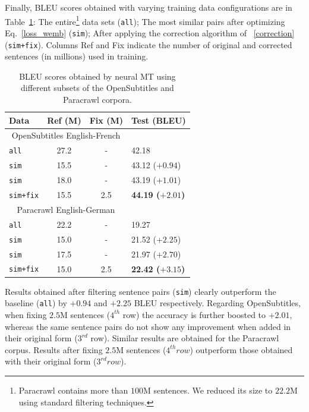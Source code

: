 \documentclass[11pt,a4paper]{article}
\begin{document}
Finally, BLEU scores obtained with varying training data configurations are in Table~\ref{results}:
The entire\footnote{Paracrawl contains more than $100$M sentences. We reduced its size to $22.2$M using standard filtering techniques.} data sets (\texttt{all}); 
The most similar pairs after optimizing Eq.~\eqref{loss_wemb} (\texttt{sim}); 
After applying the correction algorithm of \textsection~\ref{correction} (\texttt{sim+fix}).
Columns Ref and Fix indicate the number of original and corrected sentences (in millions) used in training.

\begin{table}[h!]
\small
\center
\begin{tabular}{lccl}
\hline
\bf Data & \bf Ref (M) & \bf Fix (M) & \bf Test (BLEU) \\ %
\hline
\multicolumn{3}{c}{\scriptsize{OpenSubtitles English-French}} \\
\texttt{all}                   & 27.2 & - & 42.18 \\
\texttt{sim}            & 15.5 & - & 43.12  ($+0.94$)\\
\texttt{sim}           & 18.0 & - & 43.19  ($+1.01$)\\
\texttt{sim+fix}     & 15.5 & 2.5 & \bf 44.19 ($+2.01$)\\
\hline
\multicolumn{3}{c}{\scriptsize{Paracrawl English-German}} \\
\texttt{all}                  & 22.2 & - & 19.27 \\ 
\texttt{sim}           & 15.0 & - & 21.52 ($+2.25$)\\
\texttt{sim}           & 17.5 & - & 21.97 ($+2.70$)\\
\texttt{sim+fix}   & 15.0 & 2.5 & \bf 22.42 ($+3.15$) \\
\hline
\end{tabular}
\caption{BLEU scores obtained by neural MT using different subsets of the OpenSubtitles and Paracrawl corpora.}
\label{results}
\end{table}

Results obtained after filtering sentence pairs (\texttt{sim}) clearly outperform the baseline (\texttt{all}) by $+0.94$ and $+2.25$ BLEU respectively.
Regarding OpenSubtitles, when fixing $2.5$M sentences ($4^{th}$ row) the accuracy is further boosted to $+2.01$, whereas the same sentence pairs do not show any improvement when added in their original form ($3^{rd}$ row).
Similar results are obtained for the Paracrawl corpus. Results after fixing $2.5$M sentences ($4^{th} row$) outperform those obtained with their original form ($3^{rd} row$).
\end{document}
